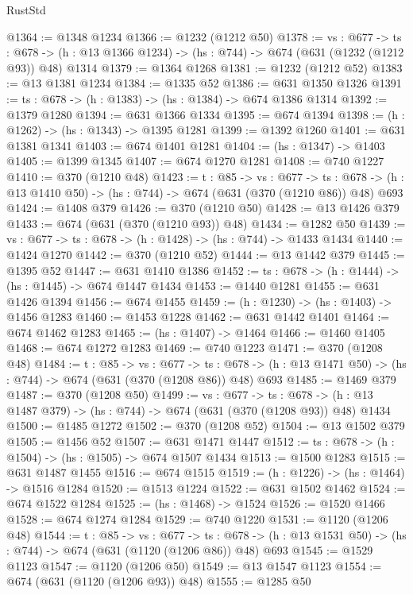 \begin{lexlean}{RustStd}
\begin{coremodule}
@1364 := @1348 @1234
@1366 := @1232 (@1212 @50)
@1378 := {vs : @677} ->
  {ts : @678} -> (h : @13 @1366 @1234) -> (hs : @744) -> @674 (@631 (@1232 (@1212 @93)) @48) @1314
@1379 := @1364 @1268
@1381 := @1232 (@1212 @52)
@1383 := @13 @1381 @1234
@1384 := @1335 @52
@1386 := @631 @1350 @1326
@1391 := {ts : @678} -> (h : @1383) -> (hs : @1384) -> @674 @1386 @1314
@1392 := @1379 @1280
@1394 := @631 @1366 @1334
@1395 := @674 @1394
@1398 := (h : @1262) -> (hs : @1343) -> @1395 @1281
@1399 := @1392 @1260
@1401 := @631 @1381 @1341
@1403 := @674 @1401 @1281
@1404 := (hs : @1347) -> @1403
@1405 := @1399 @1345
@1407 := @674 @1270 @1281
@1408 := @740 @1227
@1410 := @370 (@1210 @48)
@1423 := {t : @85} ->
  {vs : @677} ->
  {ts : @678} -> (h : @13 @1410 @50) -> (hs : @744) -> @674 (@631 (@370 (@1210 @86)) @48) @693
@1424 := @1408 @379
@1426 := @370 (@1210 @50)
@1428 := @13 @1426 @379
@1433 := @674 (@631 (@370 (@1210 @93)) @48)
@1434 := @1282 @50
@1439 := {vs : @677} -> {ts : @678} -> (h : @1428) -> (hs : @744) -> @1433 @1434
@1440 := @1424 @1270
@1442 := @370 (@1210 @52)
@1444 := @13 @1442 @379
@1445 := @1395 @52
@1447 := @631 @1410 @1386
@1452 := {ts : @678} -> (h : @1444) -> (hs : @1445) -> @674 @1447 @1434
@1453 := @1440 @1281
@1455 := @631 @1426 @1394
@1456 := @674 @1455
@1459 := (h : @1230) -> (hs : @1403) -> @1456 @1283
@1460 := @1453 @1228
@1462 := @631 @1442 @1401
@1464 := @674 @1462 @1283
@1465 := (hs : @1407) -> @1464
@1466 := @1460 @1405
@1468 := @674 @1272 @1283
@1469 := @740 @1223
@1471 := @370 (@1208 @48)
@1484 := {t : @85} ->
  {vs : @677} ->
  {ts : @678} -> (h : @13 @1471 @50) -> (hs : @744) -> @674 (@631 (@370 (@1208 @86)) @48) @693
@1485 := @1469 @379
@1487 := @370 (@1208 @50)
@1499 := {vs : @677} ->
  {ts : @678} -> (h : @13 @1487 @379) -> (hs : @744) -> @674 (@631 (@370 (@1208 @93)) @48) @1434
@1500 := @1485 @1272
@1502 := @370 (@1208 @52)
@1504 := @13 @1502 @379
@1505 := @1456 @52
@1507 := @631 @1471 @1447
@1512 := {ts : @678} -> (h : @1504) -> (hs : @1505) -> @674 @1507 @1434
@1513 := @1500 @1283
@1515 := @631 @1487 @1455
@1516 := @674 @1515
@1519 := (h : @1226) -> (hs : @1464) -> @1516 @1284
@1520 := @1513 @1224
@1522 := @631 @1502 @1462
@1524 := @674 @1522 @1284
@1525 := (hs : @1468) -> @1524
@1526 := @1520 @1466
@1528 := @674 @1274 @1284
@1529 := @740 @1220
@1531 := @1120 (@1206 @48)
@1544 := {t : @85} ->
  {vs : @677} ->
  {ts : @678} -> (h : @13 @1531 @50) -> (hs : @744) -> @674 (@631 (@1120 (@1206 @86)) @48) @693
@1545 := @1529 @1123
@1547 := @1120 (@1206 @50)
@1549 := @13 @1547 @1123
@1554 := @674 (@631 (@1120 (@1206 @93)) @48)
@1555 := @1285 @50

\end{coremodule}
\end{lexlean}
